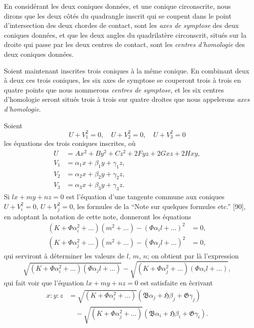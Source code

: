 \documentclass[11pt,a4paper]{book}
\begin{document}
En consid\'{e}rant les deux coniques donn\'{e}es, et une conique circonscrite, nous dirons que les deux c\^{o}t\'{e}s du quadrangle inscrit qui se coupent dans le point d'intersection des deux chordes de contact, sont les \emph{axes de symptose} des deux coniques donn\'{e}es, et que les deux angles du quadrilat\`{e}re circonscrit, situ\'{e}s sur la droite qui passe par les deux centres de contact, sont les \emph{centres d'homologie} des deux coniques donn\'{e}es.

Soient maintenant inscrites trois coniques \`{a} la m\^{e}me conique. En combinant deux \`{a} deux ces trois coniques, les six axes de symptose se couperont trois \`{a} trois en quatre points que nous nommerons \emph{centres de symptose}, et les six centres d'homologie seront situ\'{e}s trois \`{a} trois sur quatre droites que nous appelerons \emph{axes d'homologie}.

Soient
\[
U + V_1^2 = 0, \quad U + V_2^2 = 0, \quad U + V_3^2 = 0
\]
les \'{e}quations des trois coniques inscrites, o\`{u}
\begin{align*}
U &= Ax^2 + By^2 + Cz^2 + 2Fyz + 2Gxz + 2Hxy, \\
V_1 &= \alpha_1 x + \beta_1 y + \gamma_1 z, \\
V_2 &= \alpha_2 x + \beta_2 y + \gamma_2 z, \\
V_3 &= \alpha_3 x + \beta_3 y + \gamma_3 z.
\end{align*}
Si $lx + my + nz = 0$ est l'\'{e}quation d'une tangente commune aux coniques $U + V_i^2 = 0$, $U + V_j^2 = 0$, les formules de la ``Note sur quelques formules etc.'' [90], en adoptant la notation de cette note, donneront les \'{e}quations
\begin{align*}
(K + \Phi\alpha_i^2 + \ldots)(m^2 + \ldots) - (\Phi\alpha_i l + \ldots)^2 &= 0, \\
(K + \Phi\alpha_j^2 + \ldots)(m^2 + \ldots) - (\Phi\alpha_j l + \ldots)^2 &= 0,
\end{align*}
qui serviront \`{a} d\'{e}terminer les valeurs de $l$, $m$, $n$; on obtient par l\`{a} l'expression
\[
\sqrt{(K + \Phi\alpha_i^2 + \ldots)(\Phi\alpha_j l + \ldots)} - \sqrt{(K + \Phi\alpha_j^2 + \ldots)(\Phi\alpha_i l + \ldots)},
\]
qui fait voir que l'\'{e}quation $lx + my + nz = 0$ est satisfaite en \^{e}crivant
\begin{equation}\tag{1}
\begin{aligned}
x : y : z &= \sqrt{(K + \Phi\alpha_i^2 + \ldots)}(\mathfrak{B}\alpha_j + \mathfrak{H}\beta_j + \mathfrak{G}\gamma_j) \\
&\quad - \sqrt{(K + \Phi\alpha_j^2 + \ldots)}(\mathfrak{B}\alpha_i + \mathfrak{H}\beta_i + \mathfrak{G}\gamma_i).
\end{aligned}
\end{equation}
\end{document}
